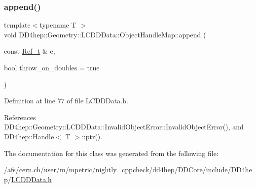 \subsubsection{\texorpdfstring{append()}{append()}\hspace{0.1cm}{\footnotesize\ttfamily [2/2]}}
{\footnotesize\ttfamily template$<$typename T $>$ \\
void D\+D4hep\+::\+Geometry\+::\+L\+C\+D\+D\+Data\+::\+Object\+Handle\+Map\+::append (\begin{DoxyParamCaption}\item[{const \hyperlink{group___d_d4_h_e_p___g_e_o_m_e_t_r_y_ga40af83be6718bb8828a3d83dc7f8c930}{Ref\+\_\+t} \&}]{e,  }\item[{bool}]{throw\+\_\+on\+\_\+doubles = {\ttfamily true} }\end{DoxyParamCaption})\hspace{0.3cm}{\ttfamily [inline]}}



Definition at line 77 of file L\+C\+D\+D\+Data.\+h.



References D\+D4hep\+::\+Geometry\+::\+L\+C\+D\+D\+Data\+::\+Invalid\+Object\+Error\+::\+Invalid\+Object\+Error(), and D\+D4hep\+::\+Handle$<$ T $>$\+::ptr().



The documentation for this class was generated from the following file\+:\begin{DoxyCompactItemize}
\item 
/afs/cern.\+ch/user/m/mpetric/nightly\+\_\+cppcheck/dd4hep/\+D\+D\+Core/include/\+D\+D4hep/\hyperlink{_l_c_d_d_data_8h}{L\+C\+D\+D\+Data.\+h}\end{DoxyCompactItemize}
